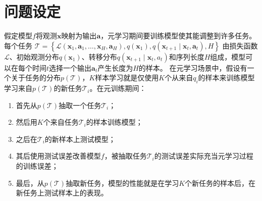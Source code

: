 \documentclass[11pt,twoside,a4paper]{ctexart}
\begin{document}
	\section{问题设定}
	假定模型$f$将观测$\mathbf x$映射为输出$\mathbf a$，元学习期间要训练模型使其能调整到许多任务。每个任务
	$\mathcal T=\left\{\mathcal L(\mathbf x_1, \mathbf a_1, \ldots, \mathbf x_H, \mathbf a_H), q(\mathbf x_1), q(\mathbf x_{t+1}\mid\mathbf x_t, \mathbf a_t), H\right\}$
	由损失函数$\mathcal L$、初始观测分布$q(\mathbf x_1)$、转移分布$q\left(\mathbf x_{t+1}\mid\mathbf x_t,a_t\right)$和序列长度$H$组成，模型可以在每个时间$t$选择一个输出$\mathbf a_t$产生长度为$H$的样本。
	在元学习场景中，假设有一个关于任务的分布$p(\mathcal T)$，$K$样本学习就是仅使用$K$个从来自$q_i$的样本来训练模型学习来自$p(\mathcal T)$的新任务$\mathcal T_i$。在元训练期间：
	\begin{enumerate}
		\item 首先从$p(\mathcal T)$抽取一个任务$\mathcal T_i$；
		\item 然后用$K$个来自任务$\mathcal T_i$的样本训练模型；
		\item 之后在$\mathcal T_i$的新样本上测试模型；
		\item 其后使用测试误差改善模型$f$，被抽取任务$\mathcal T_i$的测试误差实际充当元学习过程的训练误差；
		\item 最后，从$p(\mathcal T)$抽取新任务，模型的性能就是在学习$K$个新任务的样本后，在新任务上测试样本上的表现。
	\end{enumerate}
	
	\clearpage
\end{document}
